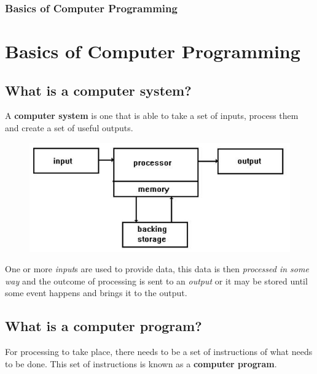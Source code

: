 \documentclass{beamer}
\begin{document}
\begin{frame}
    \frametitle{Basics of Computer Programming}
    \section{Basics of Computer Programming}
    \subsection{What is a computer system?} %

    \label{subsec:what_is_a_computer_system}
    A \textbf{computer system} is one that is able to take a set of inputs, process them and create a set of useful outputs.

    \begin{figure}
        \centering
        \includegraphics[scale=0.3]{comp_sys}
    \end{figure}

    \par
    One or more \emph{input}s are used to provide data, this data is then \emph{processed in some way} and the outcome of processing is sent to an \emph{output} or it may be stored until some event happens and brings it to the output. \\

    \subsection{What is a computer program?} %
    \label{subsec:what_is_a_computer_program}
    For processing to take place, there needs to be a set of instructions of what needs to be done. This set of instructions is known as a \textbf{computer program}.
\end{frame}
\end{document}
